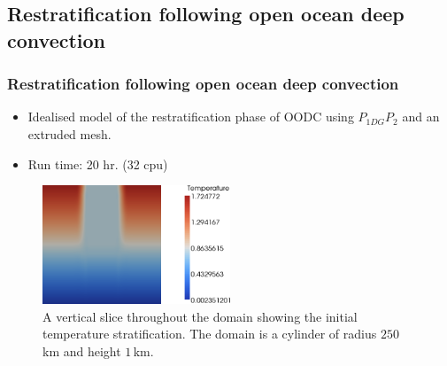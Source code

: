 \subsection{Restratification following open ocean deep convection}

\begin{frame}
    \frametitle{Restratification following open ocean deep convection}
\begin{itemize}
\item Idealised model of the restratification phase of OODC using $P_{1DG}P_2$ and an extruded mesh.
\item Run time: 20 hr. (32 cpu)
\end{itemize}
\begin{figure}
\includegraphics[width=0.5\textwidth]{./restratification_after_oodc/rousset-init.png}
\caption{A vertical slice throughout the domain showing the initial temperature stratification. The domain is a cylinder of radius $250 \,$km and height $1\,$km.}
\end{figure}
\end{frame}
%
